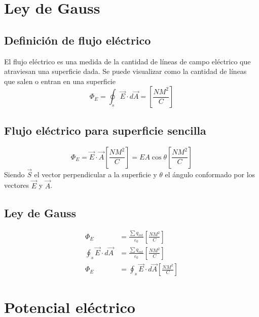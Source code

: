 \documentclass{report}
\begin{document}
  \section*{Ley de Gauss}

    \subsection*{Definición de flujo eléctrico}
      El flujo eléctrico es una medida de la cantidad de líneas de campo eléctrico que atraviesan 
      una superficie dada. Se puede visualizar como la cantidad de líneas que salen o entran en una superficie
      \begin{equation*}
        \Phi_E=\oint_s\vec{E}\cdot d\vec{A}=\left[\frac{NM^2}{C}\right]
      \end{equation*}

    \subsection*{Flujo eléctrico para superficie sencilla}
      \begin{equation*}
        \Phi_E=\vec{E}\cdot\vec{A}\left[\frac{NM^2}{C}\right]=EA\cos{\theta}\left[\frac{NM^2}{C}\right]
      \end{equation*}
    Siendo $\vec{S}$ el vector perpendicular a la superficie y $\theta$ el ángulo conformado por los vectores
    $\vec{E}$ y $\vec{A}$.

    \subsection*{Ley de Gauss}
      \begin{align*}
        \Phi_E &=\frac{\sum q_{int}}{\varepsilon_0}\left[\frac{NM^2}{C}\right]\\
        \oint_s\vec{E}\cdot d\vec{A}&=\frac{\sum q_{int}}{\varepsilon_0}\left[\frac{NM^2}{C}\right]\\
        \Phi_E &=\oint_s\vec{E}\cdot d\vec{A}\left[\frac{NM^2}{C}\right]
      \end{align*}

  \section*{Potencial eléctrico}
    
\end{document}
